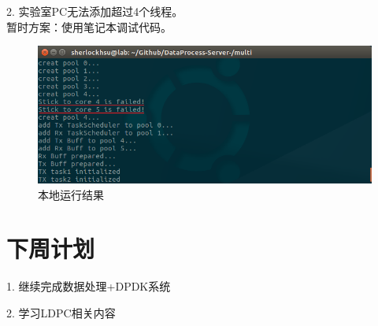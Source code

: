 \documentclass{article}
\begin{document}
2. 实验室PC无法添加超过4个线程。\\
暂时方案：使用笔记本调试代码。\\
\begin{figure}[H]
	\centering
	\includegraphics[width = .8\textwidth]{fail_result.png}
	\caption{本地运行结果}
\end{figure}

\section{下周计划}
1. 继续完成数据处理+DPDK系统

2. 学习LDPC相关内容
\end{document}
